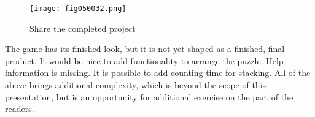 \begin{figure}[H]
   \centering
   \texttt{[image: fig050032.png]}
   \caption{Share the completed project}
\label{fig050032}
\end{figure}

The game has its finished look, but it is not yet shaped as a finished, final product. It would be nice to add functionality to arrange the puzzle. Help information is missing. It is possible to add counting time for stacking. All of the above brings additional complexity, which is beyond the scope of this presentation, but is an opportunity for additional exercise on the part of the readers.
